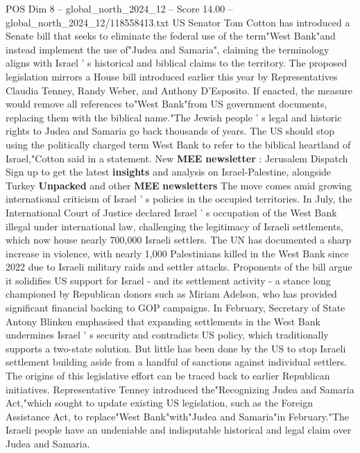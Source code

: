 \begin{textsample}{POS Dim 8 – global\_north\_2024\_12 – Score 14.00 – global\_north\_2024\_12/118558413.txt}  \label{ex:f8_pos_091}
US Senator Tom Cotton has introduced a Senate bill that seeks to eliminate the federal use of the term"West Bank"and instead implement the use of"Judea and Samaria", claiming the terminology aligns with Israel ' s historical and biblical claims to the territory.
The proposed legislation mirrors a House bill introduced earlier this year by Representatives Claudia Tenney, Randy Weber, and Anthony D'Esposito.
If enacted, the measure would remove all references to"West Bank"from US government documents, replacing them with the biblical name."The Jewish people ' s legal and historic rights to Judea and Samaria go back thousands of years.
The US should stop using the politically charged term West Bank to refer to the biblical heartland of Israel,"Cotton said in a statement.
New \textbf{MEE} \textbf{newsletter} : Jerusalem Dispatch Sign up to get the latest \textbf{insights} and analysis on Israel-Palestine, alongside Turkey \textbf{Unpacked} and other \textbf{MEE} \textbf{newsletters} The move comes amid growing international criticism of Israel ' s policies in the occupied territories.
In July, the International Court of Justice declared Israel ' s occupation of the West Bank illegal under international law, challenging the legitimacy of Israeli settlements, which now house nearly 700,000 Israeli settlers.
The UN has documented a sharp increase in violence, with nearly 1,000 Palestinians killed in the West Bank since 2022 due to Israeli military raids and settler attacks.
Proponents of the bill argue it solidifies US support for Israel - and its settlement activity - a stance long championed by Republican donors such as Miriam Adelson, who has provided significant financial backing to GOP campaigns.
In February, Secretary of State Antony Blinken emphasised that expanding settlements in the West Bank undermines Israel ' s security and contradicts US policy, which traditionally supports a two-state solution.
But little has been done by the US to stop Israeli settlement building aside from a handful of sanctions against individual settlers.
The origins of this legislative effort can be traced back to earlier Republican initiatives.
Representative Tenney introduced the"Recognizing Judea and Samaria Act,"which sought to update existing US legislation, such as the Foreign Assistance Act, to replace"West Bank"with"Judea and Samaria"in February."The Israeli people have an undeniable and indisputable historical and legal claim over Judea and Samaria.

\end{textsample}
